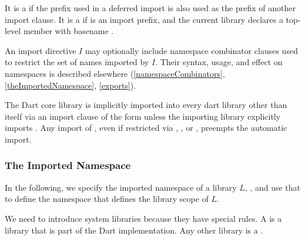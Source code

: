 \documentclass[makeidx]{article}
\begin{document}
{\LMHash{}%
It is a  if the prefix used in a deferred import
is also used as the prefix of another import clause.
It is a  if \id{} is an import prefix,
and the current library declares a top-level member with basename \id.

\LMHash{}%
An import directive $I$ may optionally include namespace combinator clauses
used to restrict the set of names imported by $I$.
Their syntax, usage, and effect on namespaces is described elsewhere
(\ref{namespaceCombinators}, \ref{theImportedNamespace},
\ref{exports}).

\LMHash{}%
The Dart core library 
is implicitly imported into every dart library other than itself
via an import clause of the form
unless the importing library explicitly imports .
Any import of ,
even if restricted via \SHOW, \HIDE, or \AS,
preempts the automatic import.


\subsubsection{The Imported Namespace}

\LMHash{}%
In the following, we specify the imported namespace of a library $L$,
,
and use that to define the namespace that defines the library scope of $L$.

\LMHash{}%
We need to introduce system libraries because they have special rules.
A  is a library that is part of the Dart implementation.
Any other library is a .


}
\end{document}
